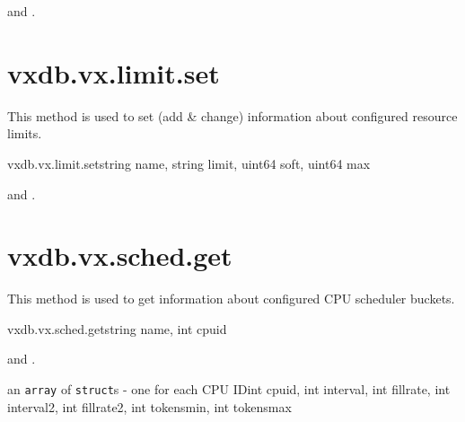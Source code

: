 \begin{rpcaccess}
 and \rpcownerchecks.
\end{rpcaccess}

\rpcreturnnil

\rpcnoerrors


\section{vxdb.vx.limit.set}

This method is used to set (add \& change) information about configured
resource limits.

\begin{rpcsynopsis}{vxdb.vx.limit.set}{string name, string limit, uint64 soft,
	uint64 max}
\end{rpcsynopsis}

\begin{rpcaccess}
 and \rpcownerchecks.
\end{rpcaccess}

\rpcreturnnil

\rpcnoerrors


\section{vxdb.vx.sched.get}

This method is used to get information about configured CPU scheduler buckets.

\begin{rpcsynopsis}{vxdb.vx.sched.get}{string name, int cpuid}
\end{rpcsynopsis}

\begin{rpcaccess}
 and \rpcownerchecks.
\end{rpcaccess}

\begin{rpcreturncomplex}{an \texttt{array} of \texttt{struct}s - one for each
	CPU ID}{int cpuid, int interval, int fillrate, int interval2,
	int fillrate2, int tokensmin, int tokensmax}
\end{rpcreturncomplex}

